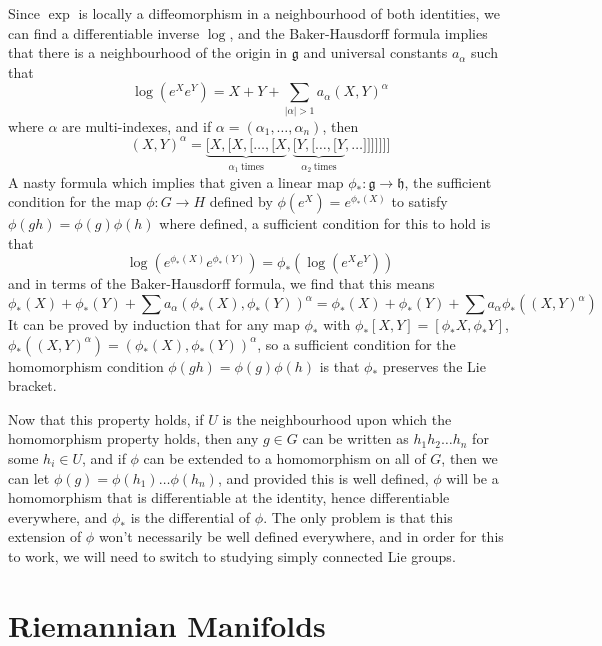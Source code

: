 Since $\exp$ is locally a diffeomorphism in a neighbourhood of both identities, we can find a differentiable inverse $\log$, and the Baker-Hausdorff formula implies that there is a neighbourhood of the origin in $\mathfrak{g}$ and universal constants $a_\alpha$ such that
%
\[ \log(e^X e^Y) = X + Y + \sum_{|\alpha| > 1} a_\alpha (X,Y)^\alpha \]
%
where $\alpha$ are multi-indexes, and if $\alpha = (\alpha_1, \dots, \alpha_n)$, then
%
\[ (X,Y)^\alpha = \underbrace{[X, [X, [\dots, [X}_{\alpha_1\ \text{times}}, \underbrace{[Y, [\dots, [Y}_{\alpha_2\ \text{times}}, \dots]]]]]]] \]
%
A nasty formula which implies that given a linear map $\phi_*: \mathfrak{g} \to \mathfrak{h}$, the sufficient condition for the map $\phi: G \to H$ defined by $\phi(e^X) = e^{\phi_*(X)}$ to satisfy $\phi(gh) = \phi(g) \phi(h)$ where defined, a sufficient condition for this to hold is that
%
\[ \log(e^{\phi_*(X)} e^{\phi_*(Y)}) = \phi_*(\log(e^X e^Y)) \]
%
and in terms of the Baker-Hausdorff formula, we find that this means
%
\[ \phi_*(X) + \phi_*(Y) + \sum a_\alpha (\phi_*(X), \phi_*(Y))^\alpha = \phi_*(X) + \phi_*(Y) + \sum a_\alpha \phi_*((X,Y)^\alpha) \]
%
It can be proved by induction that for any map $\phi_*$ with $\phi_*[X,Y] = [\phi_*X, \phi_*Y]$, $\phi_*((X,Y)^\alpha) = (\phi_*(X), \phi_*(Y))^\alpha$, so a sufficient condition for the homomorphism condition $\phi(gh) = \phi(g)\phi(h)$ is that $\phi_*$ preserves the Lie bracket.

Now that this property holds, if $U$ is the neighbourhood upon which the homomorphism property holds, then any $g \in G$ can be written as $h_1 h_2 \dots h_n$ for some $h_i \in U$, and if $\phi$ can be extended to a homomorphism on all of $G$, then we can let $\phi(g) = \phi(h_1) \dots \phi(h_n)$, and provided this is well defined, $\phi$ will be a homomorphism that is differentiable at the identity, hence differentiable everywhere, and $\phi_*$ is the differential of $\phi$. The only problem is that this extension of $\phi$ won't necessarily be well defined everywhere, and in order for this to work, we will need to switch to studying simply connected Lie groups.




\chapter{Riemannian Manifolds}

